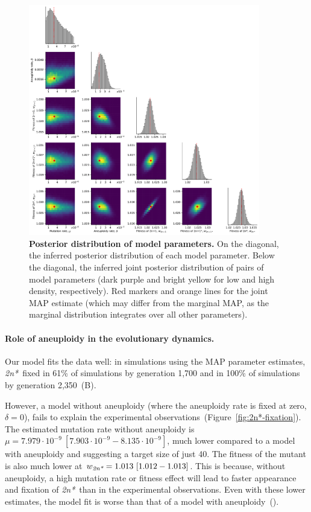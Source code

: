 \documentclass[12pt]{extarticle}
\newcommand{\eumt}{\emph{2n*}}
\begin{document}
\begin{figure}[h!]
  \centering
\includegraphics[width=0.9\textwidth]{../figures/posterior.pdf}
  \caption{
  \textbf{Posterior distribution of model parameters.}
On the diagonal, the inferred posterior distribution of each model parameter. 
Below the diagonal, the inferred joint posterior distribution of pairs of model parameters (dark purple and bright yellow for low and high density, respectively). Red markers and orange lines for the joint MAP estimate (which may differ from the marginal MAP, as the marginal distribution integrates over all other parameters).
} 
  \label{fig:posterior}
\end{figure}

\paragraph{Role of aneuploidy in the evolutionary dynamics.}

Our model fits the data well: in simulations using the MAP parameter estimates, \eumt\ fixed in 61\% of simulations by generation 1,700 and in 100\% of simulations by generation 2,350~(B).
 
However, a model without aneuploidy (where the aneuploidy rate is fixed at zero, $\delta=0$), fails to explain the experimental observations~(Figure~\ref{fig:2n*-fixation}). %
The estimated mutation rate without aneuploidy is $\mu=7.979\cdot10^{-9}\ [7.903\cdot 10^{-9}-8.135\cdot10^{-9}]$, much lower compared to a model with aneuploidy and suggesting a target size of just 40. 
The fitness of the mutant is also much lower at $w_{\eumt}=1.013\ [1.012-1.013]$.
This is because, without aneuploidy, a high mutation rate or fitness effect will lead to faster appearance and fixation of \eumt\ than in the experimental observations. Even with these lower estimates, the model fit is worse than that of a model with aneuploidy~(). 
\end{document}
